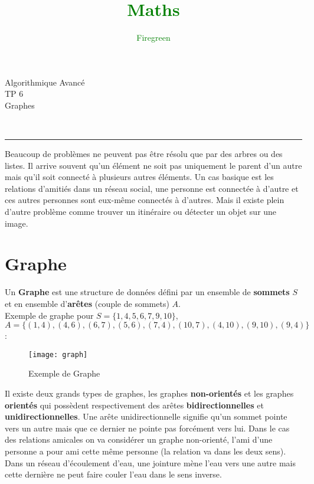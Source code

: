 \documentclass[11pt]{extarticle}
\author{\textcolor{Green}{Firegreen}}
\title{\textcolor{Green}{\textbf{Maths}}}
\begin{document}
\begin{minipage}[t]{0.3\paperwidth}
\begin{flushleft}
\end{flushleft}
\end{minipage}
\begin{minipage}[t]{0.4\paperwidth}
\begin{flushright}
\noindent \Huge{Algorithmique Avancé} \\
\noindent \LARGE{TP 6} \\
\noindent \Large{Graphes}
\end{flushright}
\end{minipage}\\
\begin{center}
\rule{\textwidth}{0.2cm}
\end{center}
Beaucoup de problèmes ne peuvent pas être résolu que par des arbres ou des listes. Il arrive souvent qu'un élément ne soit pas uniquement le parent d'un autre mais qu'il soit connecté à plusieurs autres éléments. Un cas basique est les relations d'amitiés dans un réseau social, une personne est connectée à d'autre et ces autres personnes sont eux-même connectés à d'autres. Mais il existe plein d'autre problème comme trouver un itinéraire ou détecter un objet sur une image.
  
\section{Graphe}
Un \textbf{Graphe} est une structure de données défini par un ensemble de \textbf{sommets} $S$ et en ensemble d'\textbf{arêtes} (couple de sommets) $A$.\\
Exemple de graphe pour $S=\{1, 4, 5, 6, 7, 9, 10\}$,\\ $A=\{(1, 4), (4, 6), (6, 7), (5, 6), (7, 4), (10, 7), (4, 10), (9, 10), (9, 4)\}$:\\
\begin{figure}[H]
\begin{center}
\texttt{[image: graph]}
\caption{Exemple de Graphe}
\end{center}
\end{figure}
Il existe deux grands types de graphes, les graphes \textbf{non-orientés} et les graphes \textbf{orientés} qui possèdent respectivement des arêtes \textbf{bidirectionnelles} et \textbf{unidirectionnelles}. Une arête unidirectionnelle signifie qu'un sommet pointe vers un autre mais que ce dernier ne pointe pas forcément vers lui. Dans le cas des relations amicales on va considérer un graphe non-orienté, l'ami d'une personne a pour ami cette même personne (la relation va dans les deux sens). Dans un réseau d'écoulement d'eau, une jointure mène l'eau vers une autre mais cette dernière ne peut faire couler l'eau dans le sens inverse.
\end{document}
